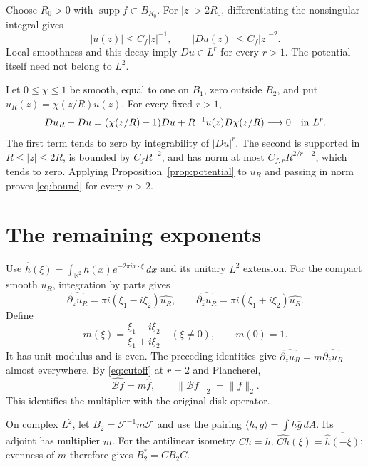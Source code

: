 \documentclass[11pt]{article}
\newcommand{\R}{\mathbb R}
\newcommand{\B}{\mathcal B}
\newcommand{\dz}{\partial_z}
\newcommand{\db}{\partial_{\bar z}}
\DeclareMathOperator{\supp}{supp}
\begin{document}
Choose \(R_0>0\) with \(\supp f\subset B_{R_0}\).
For \(|z|>2R_0\), differentiating the nonsingular integral gives
\[
 |u(z)|\le C_f|z|^{-1},\qquad |Du(z)|\le C_f|z|^{-2}.
\]
Local smoothness and this decay imply \(Du\in L^r\) for every \(r>1\).
The potential itself need not belong to \(L^2\).

Let \(0\le\chi\le1\) be smooth, equal to one on \(B_1\), zero outside
\(B_2\), and put \(u_R(z)=\chi(z/R)u(z)\).
For every fixed \(r>1\),
\begin{equation}\label{eq:cutoff}
 Du_R-Du=(\chi(z/R)-1)Du+R^{-1}u(z)D\chi(z/R)
                   \longrightarrow0\quad\hbox{in }L^r .
\end{equation}
The first term tends to zero by integrability of \(|Du|^r\).
The second is supported in \(R\le|z|\le2R\), is bounded by
\(C_fR^{-2}\), and has norm at most \(C_{f,r}R^{2/r-2}\),
which tends to zero. Applying Proposition~\ref{prop:potential} to
\(u_R\) and passing in norm proves \eqref{eq:bound} for every \(p>2\).

\section{The remaining exponents}

Use \(\widehat h(\xi)=\int_{\R^2}h(x)e^{-2\pi i x\cdot\xi}\,dx\)
and its unitary \(L^2\) extension. For the compact smooth \(u_R\),
integration by parts gives
\[
 \widehat{\dz u_R}=\pi i(\xi_1-i\xi_2)\widehat{u_R},\qquad
 \widehat{\db u_R}=\pi i(\xi_1+i\xi_2)\widehat{u_R}.
\]
Define
\begin{equation}\label{eq:multiplier}
 m(\xi)=\frac{\xi_1-i\xi_2}{\xi_1+i\xi_2}\quad(\xi\ne0),\qquad
 m(0)=1.
\end{equation}
It has unit modulus and is even. The preceding identities give
\(\widehat{\dz u_R}=m\widehat{\db u_R}\) almost everywhere.
By \eqref{eq:cutoff} at \(r=2\) and Plancherel,
\[
 \widehat{\B f}=m\widehat f,\qquad \|\B f\|_2=\|f\|_2.
\]
This identifies the multiplier with the original disk operator.

On complex \(L^2\), let \(B_2=\mathcal F^{-1}m\mathcal F\) and
use the pairing \(\langle h,g\rangle=\int h\bar g\,dA\).
Its adjoint has multiplier \(\bar m\).
For the antilinear isometry \(Ch=\bar h\),
\(\widehat{Ch}(\xi)=\overline{\widehat h(-\xi)}\);
evenness of \(m\) therefore gives \(B_2^*=CB_2C\).
\end{document}
